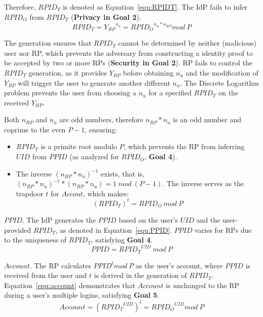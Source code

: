 Therefore, $RPID_T$ is denoted as Equation~\ref{equ:RPIDT}. The IdP fails to infer ${RPID_O}$ from $RPID_T$ (\textbf{Privacy in Goal 2}).
   \begin{equation}
   RPID_T = {Y_{RP}}^{n_{u}} = {RPID_O}^{n_{u}* n_{RP}} mod \ P
   \label{equ:RPIDT}
   \end{equation}

The generation ensures that $RPID_T$ cannot be determined by neither (malicious) user nor RP, which prevents the adversary from constructing a identity proof to be accepted by two or more RPs (\textbf{Security in Goal 2}). RP fails to control the $RPID_T$ generation, as it provides $Y_{RP}$ before obtaining $n_{u}$ and the modification of $Y_{RP}$ will trigger the user to generate another different  $n_{u}$. The Discrete Logarithm problem prevents the user from choosing a $n_{u}$ for a specified $RPID_T$ on the received $Y_{RP}$.

Both $n_{RP}$ and $n_{u}$ are odd numbers, therefore $n_{RP}*n_{u}$ is an odd number and coprime to the even $P-1$, ensuring:
 \begin{itemize}
   \item $RPID_T$ is a primite root modulo $P$, which prevents the RP from inferring $UID$ from $PPID$ (as analyzed for $RPID_O$, \textbf{Goal 4}).
   \item The inverse $(n_{RP}*n_{u})^{-1}$ exists, that is, $(n_{RP}*n_{u})^{-1} * (n_{RP}*n_{u}) = 1 \ mod \ (P-1)$. The inverse  serves as  the trapdoor $t$ for $Accout$, which makes:
   \begin{equation}
   (RPID_T)^t = RPID_O \ mod \ P
   \label{equ:trapdoor}
   \end{equation}
 \end{itemize}

{$PPID$}. The IdP generates the $PPID$ based on the user's $UID$ and the user-provided $RPID_T$, as denoted in Equation~\ref{equ:PPID}. $PPID$ varies for RPs due to the uniqueness of $RPID_T$, satisfying \textbf{Goal 4}.
 \begin{equation}
   PPID = {RPID_T}^{UID} \ mod \ P
   \label{equ:PPID}
   \end{equation}

{$Account$}. The RP calculates $PPID^t mod \ P$ as the  user's account, where $PPID$ is received from the user and $t$ is derived in the generation of $RPID_T$. Equation~\ref{equ:account} demonstrates that $Account$ is unchanged to the RP during a user's multiple logins, satisfying \textbf{Goal 5}.
 \begin{equation}
   Account = ({RPID_T}^{UID})^t = {RPID_O}^{UID} mod \ P
   \label{equ:account}
   \end{equation}


